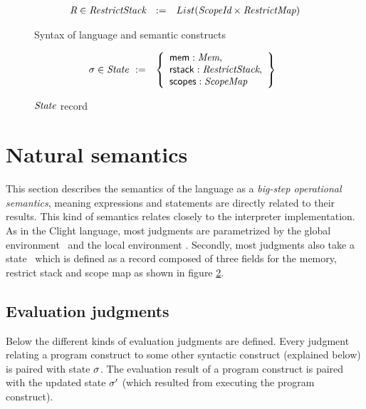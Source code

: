 \begin{figure}[H]
\[{\begin{array}{lrl}
    \textit{R} \in \textit{RestrictStack}    & :=        &  List(\textit{ScopeId} \times \textit{RestrictMap}) \\

    \end{array}
    }
    \]
\vspace*{-0.3cm}
\caption{Syntax of language and semantic constructs}
\label{figure:syntax}
\end{figure}
\begin{figure}[htp]
    \centering
\[
\begin{array}{@{}l@{\quad}lr}
  \text{$\Statevar \in \State$ \ :=} & \left\{
  \begin{array}{l}
    \Memstatemember : \Mem, \\
    \Restrictstatemember : \Restrictstack, \\
    \Scopesstatemember : \Scopemap
  \end{array}
  \right\}   
\end{array}
\]
\vspace*{-0.3cm}
\caption{$\textit{State}$ record}
\label{figure:state}
\end{figure}



\section{Natural semantics}\label{section:semantics}
This section describes the semantics of the language as a \textit{big-step operational semantics},
meaning expressions and statements are directly related to their results.
This kind of semantics relates closely to the interpreter implementation.
As in the Clight language, most judgments are parametrized by the global environment \Globalsvar \ and the local environment \Envvar.
Secondly, most judgments also take a state \Statevar \ which is defined as a record composed of three fields for the memory, restrict stack and scope map
as shown in figure \ref{figure:state}.



\subsection{Evaluation judgments}
Below the different kinds of evaluation judgments are defined.
Every judgment relating a program construct to some other syntactic construct (explained below) is paired with state $\sigma$.
The evaluation result of a program construct is paired with the updated state $\sigma'$ (which resulted from executing the program construct).


